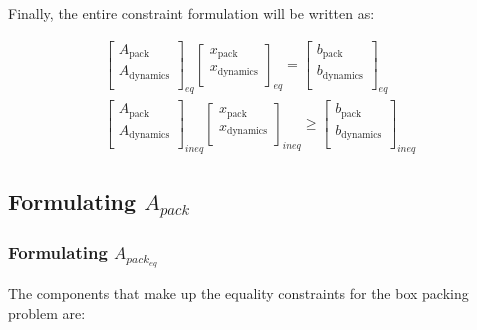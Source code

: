 \documentclass[letterpaper, 10pt, conference]{IEEEtran}
\begin{document}
Finally, the entire constraint formulation will be written as:

\begin{subequations}
\begin{align}
    \begin{bmatrix}
        A_{\textrm{pack}}     \\
        A_{\textrm{dynamics}} \\
    \end{bmatrix}_{eq}
    \begin{bmatrix}
        x_{\textrm{pack}}     \\
        x_{\textrm{dynamics}} \\
    \end{bmatrix}_{eq} =
    \begin{bmatrix}
        b_{\textrm{pack}}     \\
        b_{\textrm{dynamics}} \\
    \end{bmatrix}_{eq} \\
    \begin{bmatrix}
        A_{\textrm{pack}}     \\
        A_{\textrm{dynamics}} \\
    \end{bmatrix}_{ineq}
    \begin{bmatrix}
        x_{\textrm{pack}}     \\
        x_{\textrm{dynamics}} \\
    \end{bmatrix}_{ineq} \geq
    \begin{bmatrix}
        b_{\textrm{pack}}     \\
        b_{\textrm{dynamics}} \\
    \end{bmatrix}_{ineq}
\end{align}
\end{subequations}

\subsection{Formulating $A_{pack}$}

\subsubsection{Formulating $A_{pack_{eq}}$}

The components that make up the equality constraints for the box packing
problem are:
\end{document}
